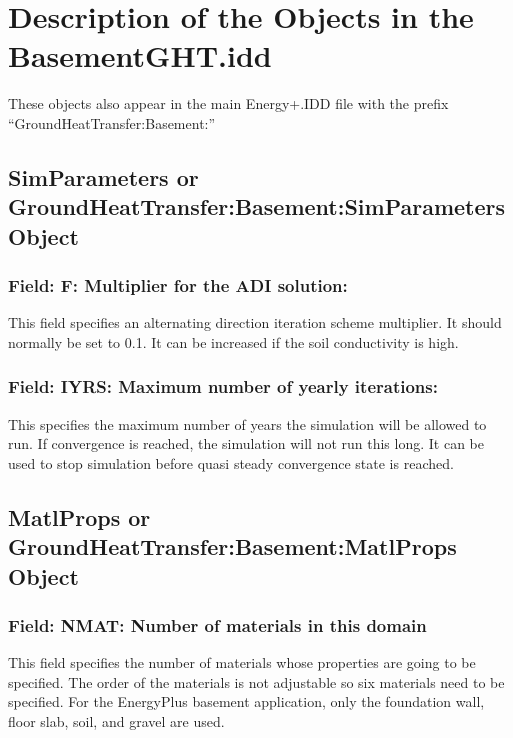 \section{Description of the Objects in the BasementGHT.idd}\label{description-of-the-objects-in-the-basementght.idd}

These objects also appear in the main Energy+.IDD file with the prefix ``GroundHeatTransfer:Basement:''

\subsection{SimParameters or GroundHeatTransfer:Basement:SimParameters Object}\label{simparameters-or-groundheattransferbasementsimparameters-object}

\subsubsection{Field: F: Multiplier for the ADI solution:}\label{field-f-multiplier-for-the-adi-solution}

This field specifies an alternating direction iteration scheme multiplier. It should normally be set to 0.1. It can be increased if the soil conductivity is high.

\subsubsection{Field: IYRS: Maximum number of yearly iterations:}\label{field-iyrs-maximum-number-of-yearly-iterations}

This specifies the maximum number of years the simulation will be allowed to run. If convergence is reached, the simulation will not run this long. It can be used to stop simulation before quasi steady convergence state is reached.

\subsection{MatlProps or GroundHeatTransfer:Basement:MatlProps Object}\label{matlprops-or-groundheattransferbasementmatlprops-object}

\subsubsection{Field: NMAT: Number of materials in this domain}\label{field-nmat-number-of-materials-in-this-domain}

This field specifies the number of materials whose properties are going to be specified. The order of the materials is not adjustable so six materials need to be specified. For the EnergyPlus basement application, only the foundation wall, floor slab, soil, and gravel are used.

